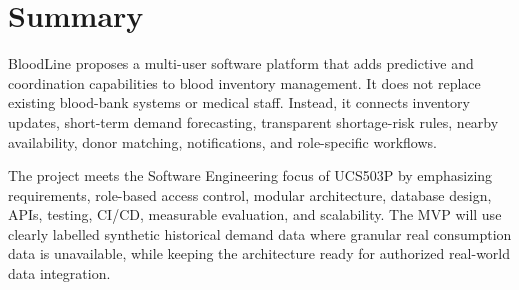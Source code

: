 \documentclass[11pt,a4paper]{article}
\begin{document}
\section{Summary}
BloodLine proposes a multi-user software platform that adds predictive and coordination capabilities to blood inventory management. It does not replace existing blood-bank systems or medical staff. Instead, it connects inventory updates, short-term demand forecasting, transparent shortage-risk rules, nearby availability, donor matching, notifications, and role-specific workflows.

The project meets the Software Engineering focus of UCS503P by emphasizing requirements, role-based access control, modular architecture, database design, APIs, testing, CI/CD, measurable evaluation, and scalability. The MVP will use clearly labelled synthetic historical demand data where granular real consumption data is unavailable, while keeping the architecture ready for authorized real-world data integration.
\end{document}
